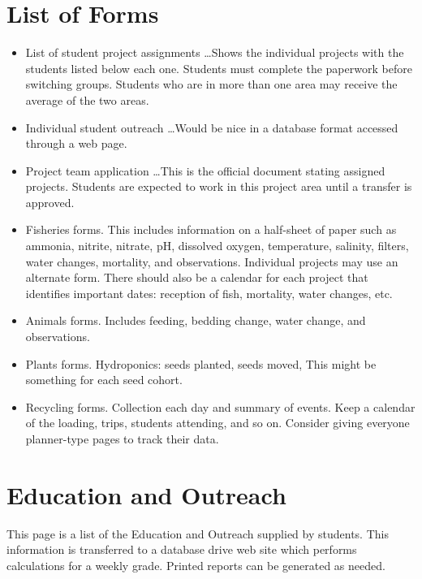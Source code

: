 \documentclass[letterpaper,10pt]{memoir}
\begin{document}
\newpage
\section*{List of Forms}

\begin{itemize}[label=$-$]
	\item List of student project assignments \ldots Shows the individual projects with the students listed below each one. Students must complete the paperwork before switching groups. Students who are in more than one area may receive the average of the two areas.

	\item Individual student outreach \ldots Would be nice in a database format accessed through a web page.

	\item Project team application \ldots This is the official document stating assigned projects. Students are expected to work in this project area until a transfer is approved.
	
	\item Fisheries forms. This includes information on a half-sheet of paper such as ammonia, nitrite, nitrate, pH, dissolved oxygen, temperature, salinity, filters, water changes, mortality, and observations. Individual projects may use an alternate form. There should also be a calendar for each project that identifies important dates: reception of fish, mortality, water changes, etc.
	
	\item Animals forms. Includes feeding, bedding change, water change, and observations.
	
	\item Plants forms. Hydroponics: seeds planted, seeds moved, This might be something for each seed cohort.
	
	\item Recycling forms. Collection each day and summary of events. Keep a calendar of the loading, trips, students attending, and so on. Consider giving everyone planner-type pages to track their data.
\end{itemize}


\newpage
\section*{Education and Outreach}

This page is a list of the Education and Outreach supplied by students. This information is transferred to a database drive web site which performs calculations for a weekly grade. Printed reports can be generated as needed.
\end{document}
